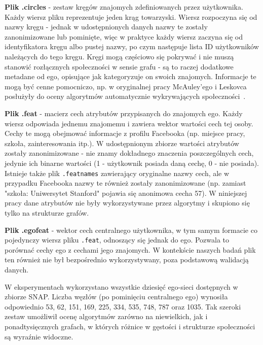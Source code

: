\textbf{Plik .circles} - zestaw kręgów znajomych zdefiniowanych przez użytkownika. Każdy wiersz pliku reprezentuje jeden krąg towarzyski. Wiersz rozpoczyna się od nazwy kręgu - jednak w udostępnionych danych nazwy te zostały zanonimizowane lub pominięte, więc w praktyce każdy wiersz zaczyna się od identyfikatora kręgu albo pustej nazwy, po czym następuje lista ID użytkowników należących do tego kręgu. Kręgi mogą częściowo się pokrywać i nie muszą stanowić rozłącznych społeczności w sensie grafu - są to raczej dodatkowe metadane od ego, opisujące jak kategoryzuje on swoich znajomych. Informacje te mogą być cenne pomocniczo, np. w oryginalnej pracy McAuley'ego i Leskovca posłużyły do oceny algorytmów automatycznie wykrywających społeczności~\cite{McAuley2012}.

\textbf{Plik .feat} - macierz cech atrybutów przypisanych do znajomych ego. Każdy wiersz odpowiada jednemu znajomemu i zawiera wektor wartości cech tej osoby. Cechy te mogą obejmować informacje z profilu Facebooka (np. miejsce pracy, szkoła, zainteresowania itp.). W udostępnionym zbiorze wartości atrybutów zostały zanonimizowane - nie znamy dokładnego znaczenia poszczególnych cech, jedynie ich binarne wartości (1 - użytkownik posiada daną cechę, 0 - nie posiada). Istnieje także plik \verb|.featnames| zawierający oryginalne nazwy cech, ale w przypadku Facebooka nazwy te również zostały zanonimizowane (np. zamiast "szkoła: Uniwersytet Stanford" pojawia się anonimowa cecha 57). W niniejszej pracy dane atrybutów nie były wykorzystywane przez algorytmy i skupiono się tylko na strukturze grafów.

\textbf{Plik .egofeat} - wektor cech centralnego użytkownika, w tym samym formacie co pojedynczy wiersz pliku \verb|.feat|, odnoszący się jednak do ego. Pozwala to porównać cechy ego z cechami jego znajomych. W kontekście naszych badań plik ten również nie był bezpośrednio wykorzystywany, poza podstawową walidacją danych.

W eksperymentach wykorzystano wszystkie dziesięć ego-sieci dostępnych w zbiorze SNAP. Liczba węzłów (po pominięciu centralnego ego) wynosiła odpowiednio 53, 62, 151, 169, 225, 334, 535, 748, 787 oraz 1035. Tak szeroki zestaw umożliwił ocenę algorytmów zarówno na niewielkich, jak i ponadtysięcznych grafach, w których różnice w gęstości i strukturze społeczności są wyraźnie widoczne.

